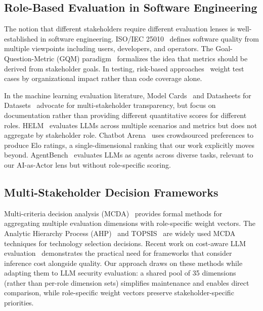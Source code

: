 \documentclass[10pt,twocolumn]{article}
\begin{document}
\subsection{Role-Based Evaluation in Software Engineering}

The notion that different stakeholders require different evaluation lenses is well-established in software engineering. ISO/IEC 25010~\citep{iso25010} defines software quality from multiple viewpoints including users, developers, and operators. The Goal-Question-Metric (GQM) paradigm~\citep{basili1994gqm} formalizes the idea that metrics should be derived from stakeholder goals. In testing, risk-based approaches~\citep{amland1999riskbased} weight test cases by organizational impact rather than code coverage alone.

In the machine learning evaluation literature, Model Cards~\citep{mitchell2019modelcards} and Datasheets for Datasets~\citep{gebru2021datasheets} advocate for multi-stakeholder transparency, but focus on documentation rather than providing different quantitative scores for different roles. HELM~\citep{liang2022helm} evaluates LLMs across multiple scenarios and metrics but does not aggregate by stakeholder role. Chatbot Arena~\citep{chiang2024arena} uses crowdsourced preferences to produce Elo ratings, a single-dimensional ranking that our work explicitly moves beyond. AgentBench~\citep{liu2024agentbench} evaluates LLMs as agents across diverse tasks, relevant to our AI-as-Actor lens but without role-specific scoring.

\subsection{Multi-Stakeholder Decision Frameworks}

Multi-criteria decision analysis (MCDA)~\citep{velasquez2013mcda} provides formal methods for aggregating multiple evaluation dimensions with role-specific weight vectors. The Analytic Hierarchy Process (AHP)~\citep{saaty1990ahp} and TOPSIS~\citep{hwang1981topsis} are widely used MCDA techniques for technology selection decisions. Recent work on cost-aware LLM evaluation~\citep{sun2024cebench} demonstrates the practical need for frameworks that consider inference cost alongside quality. Our approach draws on these methods while adapting them to LLM security evaluation: a shared pool of 35 dimensions (rather than per-role dimension sets) simplifies maintenance and enables direct comparison, while role-specific weight vectors preserve stakeholder-specific priorities.
\end{document}
